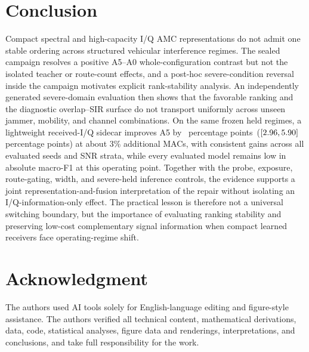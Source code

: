 \documentclass[letterpaper,journal]{IEEEtran}
\newcommand{\pp}{percentage points}
\begin{document}
\section{Conclusion}
Compact spectral and high-capacity I/Q AMC representations do not admit one
stable ordering across structured vehicular interference regimes. The sealed
campaign resolves a positive A5--A0 whole-configuration contrast but not the
isolated teacher or route-count effects, and a post-hoc severe-condition
reversal inside the campaign motivates explicit rank-stability analysis. An
independently generated severe-domain evaluation then shows that the favorable
ranking and the diagnostic overlap--SIR surface do not transport uniformly
across unseen jammer, mobility, and channel combinations. On the same frozen
held regimes, a lightweight received-I/Q sidecar improves A5 by
\SevereRepairDiff\ \pp\
($[2.96,5.90]$ \pp) at about 3\% additional
MACs, with consistent gains across all evaluated seeds and SNR strata, while
every evaluated model remains low in absolute macro-F1 at this operating
point. Together with the probe, exposure, route-gating, width, and
severe-held inference controls, the evidence supports a joint
representation-and-fusion interpretation of the repair without isolating an
I/Q-information-only effect. The practical lesson is therefore not a universal
switching boundary, but the importance of evaluating ranking stability and
preserving low-cost complementary signal information when compact learned
receivers face operating-regime shift.

\section*{Acknowledgment}
The authors used AI tools solely for English-language editing and figure-style
assistance. The authors verified all technical content, mathematical
derivations, data, code, statistical analyses, figure data and renderings,
interpretations, and conclusions, and take full responsibility for the work.



\end{document}
